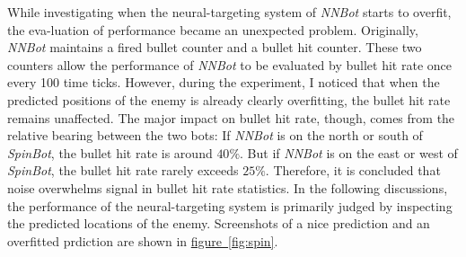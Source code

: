 \documentclass[11pt,a4paper]{article}
\begin{document}
While investigating when the neural-targeting system of \emph{NNBot} starts to overfit, the eva-luation of performance became an unexpected problem. Originally, \emph{NNBot} maintains a fired bullet counter and a bullet hit counter. These two counters allow the performance of \emph{NNBot} to be evaluated by bullet hit rate once every 100 time ticks. However, during the experiment, I noticed that when the predicted positions of the enemy is already clearly overfitting, the bullet hit rate remains unaffected. The major impact on bullet hit rate, though, comes from the relative bearing between the two bots: If \emph{NNBot} is on the north or south of \emph{SpinBot}, the bullet hit rate is around $40\%.$ But if \emph{NNBot} is on the east or west of \emph{SpinBot}, the bullet hit rate rarely exceeds $25\%.$ Therefore, it is concluded that noise overwhelms signal in bullet hit rate statistics. In the following discussions, the performance of the neural-targeting system is primarily judged by inspecting the predicted locations of the enemy. Screenshots of a nice prediction and an overfitted prdiction are shown in \hyperref[fig:spin]{figure~\ref{fig:spin}}.
\end{document}
